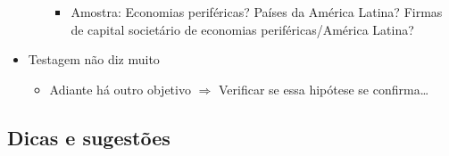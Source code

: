 \documentclass[11pt]{article}
\begin{document}
\begin{itemize}
\begin{itemize}
\begin{itemize}
\item Amostra: Economias periféricas? Países da América Latina? Firmas de capital societário de economias periféricas/América Latina?
\end{itemize}
\end{itemize}
\item Testagem não diz muito
\begin{itemize}
\item Adiante há outro objetivo \(\Rightarrow\) Verificar se essa hipótese se confirma\ldots{}
\end{itemize}
\end{itemize}

\subsection*{Dicas e sugestões}
\label{sec:org5cd63fc}
\end{document}

